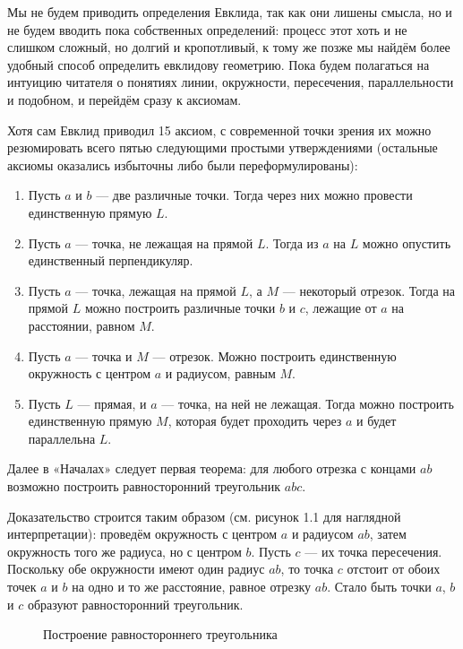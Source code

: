 Мы не будем приводить определения Евклида, так как они лишены смысла, но и не будем вводить пока собственных определений: процесс этот хоть и не слишком сложный, но долгий и кропотливый, к тому же позже мы найдём более удобный способ определить евклидову геометрию. Пока будем полагаться на интуицию читателя о понятиях линии, окружности, пересечения, параллельности и подобном, и перейдём сразу к аксиомам.

Хотя сам Евклид приводил 15 аксиом, с современной точки зрения их можно резюмировать всего пятью следующими простыми утверждениями (остальные аксиомы оказались избыточны либо были переформулированы):

\begin{enumerate}
\item Пусть $a$ и $b$ — две различные точки. Тогда через них можно провести единственную прямую $L$.
\item Пусть $a$ — точка, не лежащая на прямой $L$. Тогда из $a$ на $L$ можно опустить единственный перпендикуляр.
\item Пусть $a$ — точка, лежащая на прямой $L$, а $M$ — некоторый отрезок. Тогда на прямой $L$ можно построить различные точки $b$ и $c$, лежащие от $a$ на расстоянии, равном $M$.
\item Пусть $a$ — точка и $M$ — отрезок. Можно построить единственную окружность с центром $a$ и радиусом, равным $M$.
\item Пусть $L$ — прямая, и $a$ — точка, на ней не лежащая. Тогда можно построить единственную прямую $M$, которая будет проходить через $a$ и будет параллельна $L$.
\end{enumerate}

Далее в «Началах» следует первая теорема: для любого отрезка с концами $ab$ возможно построить равносторонний треугольник $abc$.

Доказательство строится таким образом (см. рисунок 1.1 для наглядной интерпретации): проведём окружность с центром $a$ и радиусом $ab$, затем окружность того же радиуса, но с центром $b$. Пусть $c$ — их точка пересечения. Поскольку обе окружности имеют один радиус $ab$, то точка $c$ отстоит от обоих точек $a$ и $b$ на одно и то же расстояние, равное отрезку $ab$. Стало быть точки $a$, $b$ и $c$ образуют равносторонний треугольник.

\begin{figure}[h]
\centering
{}
\caption{Построение равностороннего треугольника}
\end{figure}

